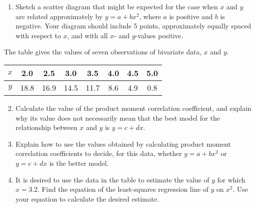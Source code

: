\begin{problem}
    \begin{enumerate}
        \item Sketch a scatter diagram that might be expected for the case when $x$ and $y$ are related approximately by $y=a+bx^{2}$, where $a$ is positive and $b$ is negative. Your diagram should include 5 points, approximately equally spaced with respect to $x$, and with all $x$- and $y$-values positive.
    \end{enumerate}

    The table gives the values of seven observations of bivariate data, $x$ and $y$.

    \begin{table}[H]
        \centering
        \begin{tabular}{|c|c|c|c|c|c|c|c|}
        \hline
        $x$ & 2.0 & 2.5 & 3.0 & 3.5 & 4.0 & 4.5 & 5.0 \\ \hline
        $y$ & 18.8 & 16.9 & 14.5 & 11.7 & 8.6 & 4.9 & 0.8 \\ \hline
        \end{tabular}
    \end{table}

    \begin{enumerate}
        \setcounter{enumi}{1}
        \item Calculate the value of the product moment correlation coefficient, and explain why its value does not necessarily mean that the best model for the relationship between $x$ and $y$ is $y=c+dx$.
        \item Explain how to use the values obtained by calculating product moment correlation coefficients to decide, for this data, whether $y=a+bx^{2}$ or $y=c+dx$ is the better model.
        \item It is desired to use the data in the table to estimate the value of $y$ for which $x=3.2$. Find the equation of the least-squares regression line of $y$ on $x^{2}$. Use your equation to calculate the desired estimate.
    \end{enumerate}
\end{problem}
